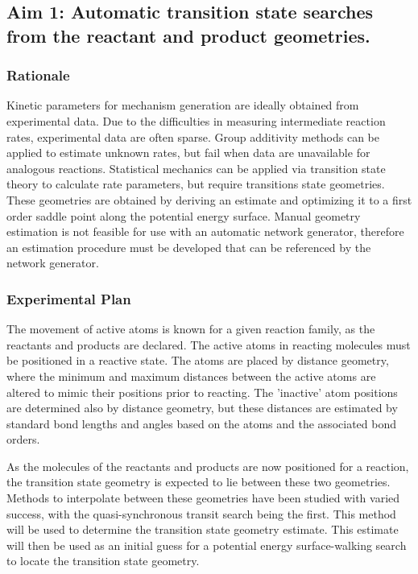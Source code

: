 \documentclass[12pt]{article}
\begin{document}
\subsection{Aim 1: Automatic transition state searches from the reactant and product geometries.}
\subsubsection{Rationale}

Kinetic parameters for mechanism generation are ideally obtained from experimental data. Due to the difficulties in measuring intermediate reaction rates, experimental data are often sparse. Group additivity methods can be applied to estimate unknown rates, but fail when data are unavailable for analogous reactions. Statistical mechanics can be applied via transition state theory to calculate rate parameters, but require transitions state geometries. These geometries are obtained by deriving an estimate and optimizing it to a first order saddle point along the potential energy surface. Manual geometry estimation is not feasible for use with an automatic network generator, therefore an estimation procedure must be developed that can be referenced by the network generator.

\subsubsection{Experimental Plan}

The movement of active atoms is known for a given reaction family, as the reactants and products are declared. The active atoms in reacting molecules must be positioned in a reactive state. The atoms are placed by distance geometry, where the minimum and maximum distances between the active atoms are altered to mimic their positions prior to reacting. The 'inactive' atom positions are determined also by distance geometry, but these distances are estimated by standard bond lengths and angles based on the atoms and the associated bond orders.

As the molecules of the reactants and products are now positioned for a reaction, the transition state geometry is expected to lie between these two geometries. Methods to interpolate between these geometries have been studied with varied success, with the quasi-synchronous transit search being the first. This method will be used to determine the transition state geometry estimate. This estimate will then be used as an initial guess for a potential energy surface-walking search to locate the transition state geometry.
\end{document}
